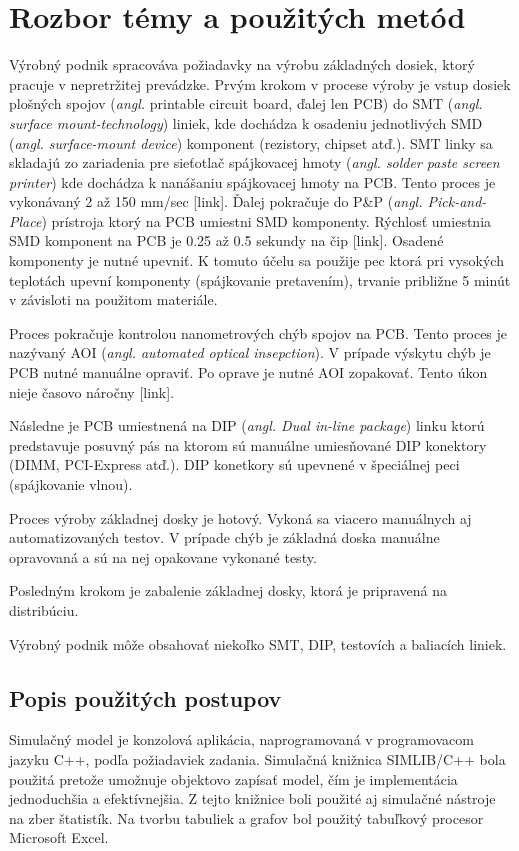 \documentclass[12pt,a4paper,titlepage,final]{article}
\begin{document}
\section{Rozbor témy a použitých metód}
Výrobný podnik spracováva požiadavky na výrobu základných dosiek, ktorý pracuje
v nepretržitej prevádzke. Prvým krokom v procese výroby je vstup dosiek plošných
spojov (\textit{angl.} printable circuit board, ďalej len PCB) do SMT
(\textit{angl. surface mount-technology}) liniek, kde dochádza k osadeniu jednotlivých
SMD (\textit{angl. surface-mount device}) komponent (rezistory, chipset atď.).
SMT linky sa skladajú zo zariadenia pre sieťotlač spájkovacej 
hmoty (\textit{angl. solder paste screen printer}) kde dochádza k nanášaniu spájkovacej
hmoty na PCB. Tento proces je vykonávaný 2 až 150 mm/sec [link]. Ďalej pokračuje
do P\&P (\textit{angl. Pick-and-Place}) prístroja ktorý na PCB umiestni 
SMD komponenty. Rýchlosť umiestnia SMD komponent na PCB je 0.25 až 0.5 sekundy
na čip [link]. Osadené komponenty je nutné upevniť. K tomuto účelu sa použije
pec ktorá pri vysokých teplotách upevní komponenty (spájkovanie pretavením), 
trvanie približne 5 minút v závisloti na použitom materiále. 

Proces pokračuje kontrolou nanometrových chýb spojov na PCB. Tento proces je 
nazývaný AOI (\textit{angl. automated optical insepction}). V prípade výskytu
chýb je PCB nutné manuálne opraviť. Po oprave je nutné AOI zopakovať. Tento
úkon nieje časovo náročny [link].

Následne je PCB umiestnená na DIP (\textit{angl. Dual in-line package})
linku ktorú predstavuje posuvný pás na ktorom sú manuálne umiesňované 
DIP konektory (DIMM, PCI-Express atď.). DIP konetkory sú upevnené v špeciálnej
peci (spájkovanie vlnou).

Proces výroby základnej dosky je hotový. Vykoná sa viacero manuálnych aj automatizovaných
testov. V prípade chýb je základná doska manuálne opravovaná a sú na nej opakovane vykonané
testy.

Posledným krokom je zabalenie základnej dosky, ktorá je pripravená na distribúciu.

Výrobný podnik môže obsahovať niekoľko SMT, DIP, testovích a baliacích liniek.

\subsection{Popis použitých postupov}
Simulačný model je konzolová aplikácia, naprogramovaná v programovacom jazyku
C++, podľa požiadaviek zadania. Simulačná knižnica SIMLIB/C++ bola použitá pretože
umožnuje objektovo zapísať model, čím je implementácia jednoduchšia a efektívnejšia.
Z tejto knižnice boli použité aj simulačné nástroje na zber štatistík. Na tvorbu
tabuliek a grafov bol použitý tabuľkový procesor Microsoft Excel.
\end{document}
